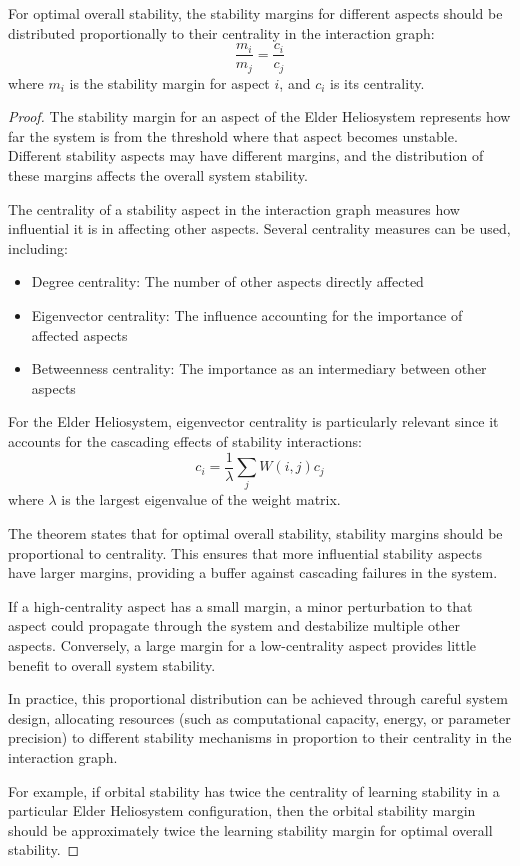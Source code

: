 \begin{theorem}
For optimal overall stability, the stability margins for different aspects should be distributed proportionally to their centrality in the interaction graph:
\begin{equation}
\frac{m_i}{m_j} = \frac{c_i}{c_j}
\end{equation}
where $m_i$ is the stability margin for aspect $i$, and $c_i$ is its centrality.
\end{theorem}

\begin{proof}
The stability margin for an aspect of the Elder Heliosystem represents how far the system is from the threshold where that aspect becomes unstable. Different stability aspects may have different margins, and the distribution of these margins affects the overall system stability.

The centrality of a stability aspect in the interaction graph measures how influential it is in affecting other aspects. Several centrality measures can be used, including:
\begin{itemize}
    \item Degree centrality: The number of other aspects directly affected
    \item Eigenvector centrality: The influence accounting for the importance of affected aspects
    \item Betweenness centrality: The importance as an intermediary between other aspects
\end{itemize}

For the Elder Heliosystem, eigenvector centrality is particularly relevant since it accounts for the cascading effects of stability interactions:
\begin{equation}
c_i = \frac{1}{\lambda} \sum_j W(i, j) c_j
\end{equation}
where $\lambda$ is the largest eigenvalue of the weight matrix.

The theorem states that for optimal overall stability, stability margins should be proportional to centrality. This ensures that more influential stability aspects have larger margins, providing a buffer against cascading failures in the system.

If a high-centrality aspect has a small margin, a minor perturbation to that aspect could propagate through the system and destabilize multiple other aspects. Conversely, a large margin for a low-centrality aspect provides little benefit to overall system stability.

In practice, this proportional distribution can be achieved through careful system design, allocating resources (such as computational capacity, energy, or parameter precision) to different stability mechanisms in proportion to their centrality in the interaction graph.

For example, if orbital stability has twice the centrality of learning stability in a particular Elder Heliosystem configuration, then the orbital stability margin should be approximately twice the learning stability margin for optimal overall stability.
\end{proof}

